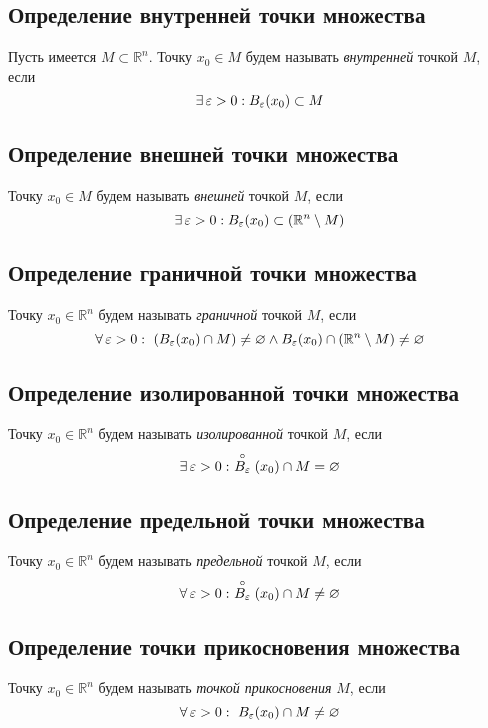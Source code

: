 \documentclass[a4paper]{article}
\begin{document}

\subsection{Определение внутренней точки множества}
 Пусть имеется $M\subset\mathbb{R}^n$. Точку $x_0\in M$ будем называть \textit{внутренней} точкой $M$, если $$\exists\operatorname{\varepsilon}>0:B_{\operatorname{\varepsilon}}(x_0)\subset M$$

\subsection{Определение внешней точки множества}
 Точку $x_0\in M$ будем называть \textit{внешней} точкой $M$, если $$\exists\operatorname{\varepsilon}>0:B_{\operatorname{\varepsilon}}(x_0)\subset (\mathbb{R}^n\setminus M)$$

\subsection{Определение граничной точки множества}
 Точку $x_0\in\mathbb{R}^n$ будем называть \textit{граничной} точкой $M$, если $$\forall \ve>0:\ \left(B_{\ve}(x_0)\cap M\right)\ne\varnothing\wedge B_{\ve}(x_0)\cap(\mathbb{R}^n\setminus M)\ne\varnothing$$ 

\subsection{Определение изолированной точки множества}
 Точку $x_0\in\mathbb{R}^n$ будем называть \textit{изолированной} точкой $M$, если $$\exists \ve>0:\ \stackrel{\circ}{B_{\ve}}(x_0)\cap M=\varnothing$$ 

\subsection{Определение предельной точки множества}
 Точку $x_0\in\mathbb{R}^n$ будем называть \textit{предельной} точкой $M$, если $$\forall \ve>0:\ \stackrel{\circ}{B_{\ve}}(x_0)\cap M\ne\varnothing$$ 

\subsection{Определение точки прикосновения множества}
 Точку $x_0\in\mathbb{R}^n$ будем называть \textit{точкой прикосновения} $M$, если $$\forall \operatorname{\varepsilon}>0:\ B_{\operatorname{\varepsilon}}(x_0)\cap M\ne\varnothing$$ 
\end{document}
